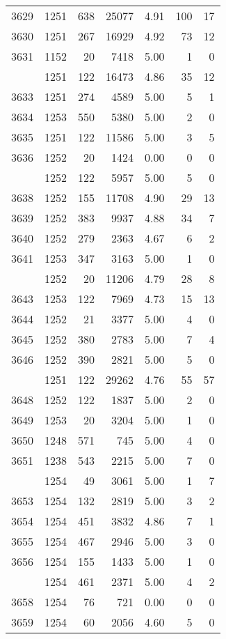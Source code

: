 \documentclass[
]{article}
\begin{document}
\begin{table}
\begin{tabular}[t]{lrrrrrr}
3629 & 1251 & 638 & 25077 & 4.91 & 100 & 17\\
3630 & 1251 & 267 & 16929 & 4.92 & 73 & 12\\
3631 & 1152 & 20 & 7418 & 5.00 & 1 & 0\\
\addlinespace
3632 & 1251 & 122 & 16473 & 4.86 & 35 & 12\\
3633 & 1251 & 274 & 4589 & 5.00 & 5 & 1\\
3634 & 1253 & 550 & 5380 & 5.00 & 2 & 0\\
3635 & 1251 & 122 & 11586 & 5.00 & 3 & 5\\
3636 & 1252 & 20 & 1424 & 0.00 & 0 & 0\\
\addlinespace
3637 & 1252 & 122 & 5957 & 5.00 & 5 & 0\\
3638 & 1252 & 155 & 11708 & 4.90 & 29 & 13\\
3639 & 1252 & 383 & 9937 & 4.88 & 34 & 7\\
3640 & 1252 & 279 & 2363 & 4.67 & 6 & 2\\
3641 & 1253 & 347 & 3163 & 5.00 & 1 & 0\\
\addlinespace
3642 & 1252 & 20 & 11206 & 4.79 & 28 & 8\\
3643 & 1253 & 122 & 7969 & 4.73 & 15 & 13\\
3644 & 1252 & 21 & 3377 & 5.00 & 4 & 0\\
3645 & 1252 & 380 & 2783 & 5.00 & 7 & 4\\
3646 & 1252 & 390 & 2821 & 5.00 & 5 & 0\\
\addlinespace
3647 & 1251 & 122 & 29262 & 4.76 & 55 & 57\\
3648 & 1252 & 122 & 1837 & 5.00 & 2 & 0\\
3649 & 1253 & 20 & 3204 & 5.00 & 1 & 0\\
3650 & 1248 & 571 & 745 & 5.00 & 4 & 0\\
3651 & 1238 & 543 & 2215 & 5.00 & 7 & 0\\
\addlinespace
3652 & 1254 & 49 & 3061 & 5.00 & 1 & 7\\
3653 & 1254 & 132 & 2819 & 5.00 & 3 & 2\\
3654 & 1254 & 451 & 3832 & 4.86 & 7 & 1\\
3655 & 1254 & 467 & 2946 & 5.00 & 3 & 0\\
3656 & 1254 & 155 & 1433 & 5.00 & 1 & 0\\
\addlinespace
3657 & 1254 & 461 & 2371 & 5.00 & 4 & 2\\
3658 & 1254 & 76 & 721 & 0.00 & 0 & 0\\
3659 & 1254 & 60 & 2056 & 4.60 & 5 & 0\\

\end{tabular}
\end{table}
\end{document}

